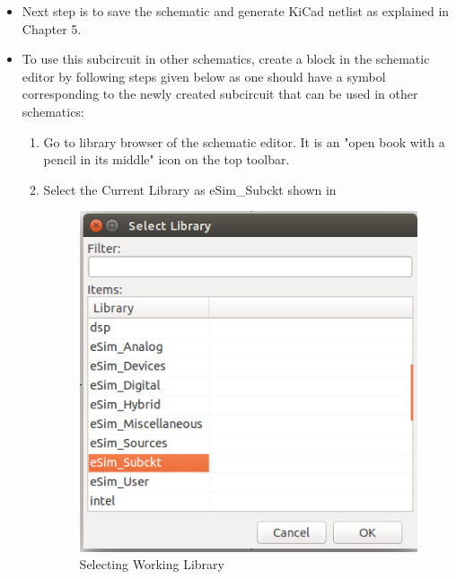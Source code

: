 \begin{itemize}
    \item Next step is to save the schematic and generate KiCad netlist as explained in Chapter 5.

    \item To use this subcircuit in other schematics, create a block in the schematic editor by following steps given below as one should have a symbol corresponding to the newly created subcircuit that can be used in other schematics:
        \begin{enumerate}
            \item Go to library browser of the schematic editor. It is an "open book with a pencil in its middle" icon on the top toolbar.
            \item Select the Current Library as eSim\_Subckt shown in  
                \begin{figure}[!htp]
                    \centering
                    \includegraphics[width =\smfig]{esim-subckt.png}
                    \caption{Selecting Working Library}
                    \label{esimsubckt}
                \end{figure}
            \pagebreak


\end{enumerate}
\end{itemize}
